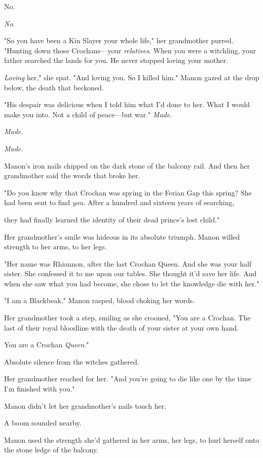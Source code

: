 No.

\emph{No}.

"So you have been a Kin Slayer your whole life," her grandmother purred. "Hunting down those Crochans---your \emph{relatives}. When you were a witchling, your father searched the lands for you. He never stopped loving your mother.

\emph{Loving} her," she spat. "And loving you. So I killed him." Manon gazed at the drop below, the death that beckoned.

"His despair was delicious when I told him what I'd done to her. What I would make you into. Not a child of peace---but war." \emph{Made.}

\emph{Made.}

\emph{Made.}

Manon's iron nails chipped on the dark stone of the balcony rail. And then her grandmother said the words that broke her.

"Do you know why that Crochan was spying in the Ferian Gap this spring? She had been sent to find \emph{you}. After a hundred and sixteen years of searching,

they had finally learned the identity of their dead prince's lost child."

Her grandmother's smile was hideous in its absolute triumph. Manon willed strength to her arms, to her legs.

"Her name was Rhiannon, after the last Crochan Queen. And she was your half sister. She confessed it to me upon our tables. She thought it'd save her life. And when she saw what you had become, she chose to let the knowledge die with her."

"I am a Blackbeak," Manon rasped, blood choking her words.

Her grandmother took a step, smiling as she crooned, "You are a Crochan. The last of their royal bloodline with the death of your sister at your own hand.

You are a Crochan \emph{Queen}."

Absolute silence from the witches gathered.

Her grandmother reached for her. "And you're going to die like one by the time I'm finished with you."

Manon didn't let her grandmother's nails touch her.

A boom sounded nearby.

Manon used the strength she'd gathered in her arms, her legs, to hurl herself onto the stone ledge of the balcony.

